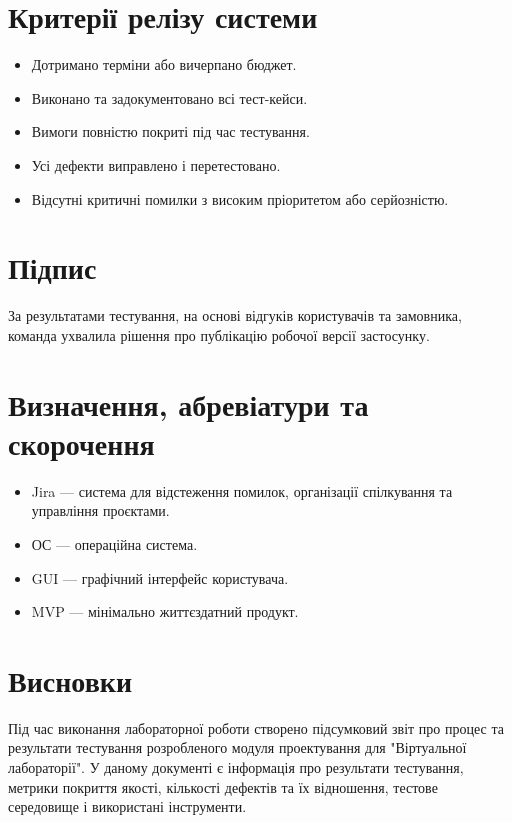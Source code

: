 \documentclass[oneside,14pt]{extarticle}
\begin{document}
\begin{normalsize}
	\section{Критерії релізу системи}
	\begin{itemize}
		\item Дотримано терміни або вичерпано бюджет.
		\item Виконано та задокументовано всі тест-кейси.
		\item Вимоги повністю покриті під час тестування.
		\item Усі дефекти виправлено і перетестовано.
		\item Відсутні критичні помилки з високим пріоритетом або серйозністю.
	\end{itemize}
	
	\section{Підпис}
	За результатами тестування, на основі відгуків користувачів та замовника, команда ухвалила рішення про публікацію робочої версії застосунку.
	
	\section{Визначення, абревіатури та скорочення}
	\begin{itemize}
		\item Jira — система для відстеження помилок, організації спілкування та управління проєктами.
		\item ОС — операційна система.
		\item GUI — графічний інтерфейс користувача.
		\item MVP — мінімально життєздатний продукт.
	\end{itemize}
	
	\section*{Висновки}
	Під час виконання лабораторної роботи створено підсумковий звіт про процес та результати тестування розробленого модуля проектування для "Віртуальної лабораторії". У даному документі є інформація про результати тестування, метрики покриття якості, кількості дефектів та їх відношення, тестове середовище і використані інструменти. 
	    
	
\end{normalsize}
\end{document}
